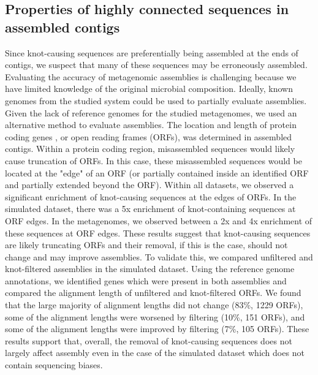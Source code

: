 \documentclass[11pt]{article} %
\begin{document}
\subsection{Properties of highly connected sequences in assembled contigs}
Since knot-causing sequences are preferentially being assembled at the ends of contigs, we suspect that many of these sequences may be erroneously assembled.   Evaluating the accuracy of metagenomic assemblies is challenging because we have limited knowledge of the original microbial composition.  Ideally, known genomes from the studied system could be used to partially evaluate assemblies.  Given the lack of reference genomes for the studied metagenomes, we used an alternative method to evaluate assemblies.  The location and length of protein coding genes , or open reading frames (ORFs), was determined in assembled contigs.  Within a protein coding region, misassembled sequences would likely cause truncation of ORFs.  In this case, these misassembled sequences would be located at the "edge" of an ORF (or partially contained inside an identified ORF and partially extended beyond the ORF).  Within all datasets, we observed a significant enrichment of knot-causing sequences at the edges of ORFs. In the simulated dataset, there was a 5x enrichment of knot-containing sequences at ORF edges.  In the metagenomes, we observed between a 2x and 4x enrichment of these sequences at ORF edges.  These results suggest that knot-causing sequences are likely truncating ORFs and their removal, if this is the case, should not change and may improve assemblies.
	To validate this, we compared unfiltered and knot-filtered assemblies in the simulated dataset.  Using the reference genome annotations, we identified genes which were present in both assemblies and compared the alignment length of unfiltered and knot-filtered ORFs.  We found that the large majority of alignment lengths did not change (83\%, 1229 ORFs), some of the alignment lengths were worsened by filtering (10\%, 151 ORFs), and some of the alignment lengths were improved by filtering (7\%, 105 ORFs).  These results support that, overall, the removal of knot-causing sequences does not largely affect assembly even in the case of the simulated dataset which does not contain sequencing biases.  
\end{document}
